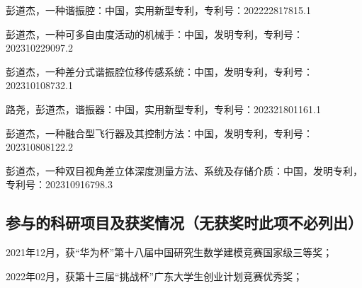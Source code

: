 \begin{resume}
  \begin{achievements}
    \item 彭道杰，一种谐振腔：中国，实用新型专利，专利号：202222817815.1
    \item 彭道杰，一种可多自由度活动的机械手：中国，发明专利，专利号：202310229097.2
    \item 彭道杰，一种差分式谐振腔位移传感系统：中国，发明专利，专利号：202310108732.1
    \item 路尧，彭道杰，谐振器：中国，实用新型专利，专利号：202321801161.1
    \item 彭道杰，一种融合型飞行器及其控制方法：中国，发明专利，专利号：202310808122.2
    \item 彭道杰，一种双目视角差立体深度测量方法、系统及存储介质：中国，发明专利，专利号：202310916798.3
  \end{achievements}

  \subsection*{参与的科研项目及获奖情况（无获奖时此项不必列出）}
  \begin{achievements}
    \item   2021年12月，获“华为杯”第十八届中国研究生数学建模竞赛国家级三等奖；
    \item 2022年02月，获第十三届“挑战杯”广东大学生创业计划竞赛优秀奖；
  \end{achievements}

\end{resume}
